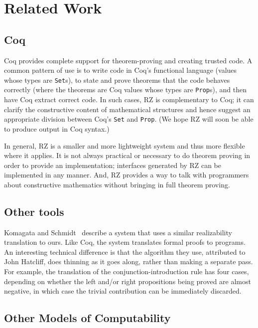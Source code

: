 \section{Related Work}
\label{sec:related-work}

\subsection{Coq}
\label{sec:comparison-with-coq}

Coq provides complete support for
theorem-proving and creating trusted code.  A common pattern of use
is to write code in Coq's functional language (values whose
types are \texttt{Set}s), to state and prove theorems
that the code behaves correctly (where the theorems are Coq values
whose types are \texttt{Prop}s), and then have Coq extract
correct code. In such cases, RZ is complementary to
Coq;  it can clarify the constructive content of mathematical
structures and hence suggest an appropriate division between Coq's
\texttt{Set} and \texttt{Prop}. (We hope RZ will soon be able to 
produce output in Coq syntax.)

In general, RZ is a smaller and more lightweight system and thus more
flexible where it applies. It is not always practical or necessary to
do theorem proving in order to provide an implementation; interfaces
generated by RZ can be implemented in any manner. And, RZ provides a way to talk with
programmers about constructive mathematics without bringing in
full theorem proving.


\subsection{Other tools}

Komagata and Schmidt~\cite{komagata+:tr95} describe a system that uses
a similar realizability translation to ours. Like Coq, the system
translates formal proofs to programs.
%
An interesting technical difference is that the algorithm they use,
attributed to John Hatcliff, does thinning as it goes along, rather
than making a separate pass. 
\iflong
For example, the translation of the
conjunction-introduction rule has four cases, depending on whether the
left and/or right propositions being proved are almost negative, in
which case the trivial contribution can be immediately discarded.
\fi

\subsection{Other Models of Computability}
\label{sec:models-of-computability}


